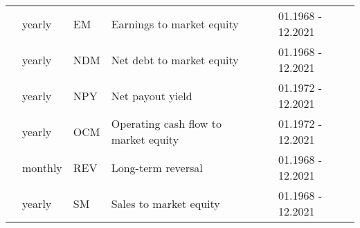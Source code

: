 \begin{landscape}
{\begin{ThreePartTable}
\begin{center}
\begin{footnotesize}
\begin{longtabu}{p{2.4cm} p{2cm} p{1.6cm} p{8.5cm} p{5.7cm} p{3.2cm}}
						  \rule{0pt}{1ex}
						  & yearly & EM & Earnings to market equity & \cite{ba/1983} & 01.1968 - 12.2021  \\
                        \rule{0pt}{1ex}
						  & yearly & NDM & Net debt to market equity & \cite{pe/ri/tu/2007} & 01.1968 - 12.2021 \\
						  \rule{0pt}{1ex}
						  & yearly & NPY & Net payout yield & \cite{bo/mi/ri/ro/2007} & 01.1972 - 12.2021  \\
						  \rule{0pt}{1ex}
						  & yearly & OCM & Operating cash flow to market equity & \cite{de/ra/ve/2004} & 01.1972 - 12.2021 \\
                        \rule{0pt}{1ex}
						  & monthly & REV & Long-term reversal &  \cite{de/th/1985} & 01.1968 - 12.2021  \\
                        \rule{0pt}{1ex}
						  & yearly & SM & Sales to market equity & \cite{ba/mu/ra/1996} & 01.1968 - 12.2021 \\
						\bottomrule
					\end{longtabu}
				\end{footnotesize}
			\end{center}
		\end{ThreePartTable}
  }
	\end{landscape}
	
	\renewcommand{\arraystretch}{1.0}
